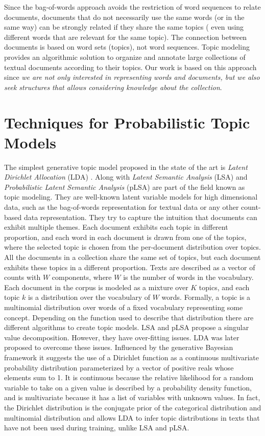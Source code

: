 Since the bag-of-words approach avoids the restriction of word sequences to relate documents, documents that do not necessarily use the same words (or in the same way) can be strongly related if they share the same topics ( even using different words that are relevant for the same topic). The connection between documents is based on  word sets (topics), not word sequences. Topic modeling provides an algorithmic solution to organize and annotate large collections of textual documents according to their topics. Our work is based on this approach since \textit{we are not only interested in representing words and documents, but we also seek structures that allows considering knowledge about the collection}.



\section{Techniques for Probabilistic Topic Models}\label{sec:techniques-prob-topics}

The simplest generative topic model proposed in the state of the art is \textit{Latent Dirichlet Allocation} (LDA) \citep{Blei2003}. Along with \textit{Latent Semantic Analysis} (LSA) \citep{Deerwester1990} and \textit{Probabilistic Latent Semantic Analysis} (pLSA) \citep{Hofmann2001} are part of the field known as topic modeling. They are well-known latent variable models for high dimensional data, such as the bag-of-words representation for textual data or any other count-based data representation. They try to capture the intuition that documents can exhibit multiple themes. Each document exhibits each topic in different proportion, and each word in each document is drawn from one of the topics, where the selected topic is chosen from the per-document distribution over topics. All the documents in a collection share the same set of topics, but each document exhibits these topics in a different proportion. Texts are described as a vector of counts with $W$ components, where $W$ is the number of words in the vocabulary. Each document in the corpus is modeled as a mixture over $K$ topics, and each topic $k$ is a distribution over the vocabulary of $W$ words. Formally, a topic is a multinomial distribution over words of a fixed vocabulary representing some concept. Depending on the function used to describe that distribution there are different algorithms to create topic models. LSA and pLSA propose a singular value decomposition. However, they have over-fitting issues. LDA was later proposed to overcome these issues. Influenced by the generative Bayesian framework it  suggests the use of a Dirichlet function as a continuous multivariate probability distribution parameterized by a vector of positive reals whose elements sum to 1.  It is continuous because the relative likelihood for a random variable to take on a given value is described by a probability density function, and is multivariate because it has a list of variables with unknown values. In fact, the Dirichlet distribution is the conjugate prior of the categorical distribution and multinomial distribution and allows LDA to infer topic distributions in texts that have not been used during training, unlike LSA and pLSA.

